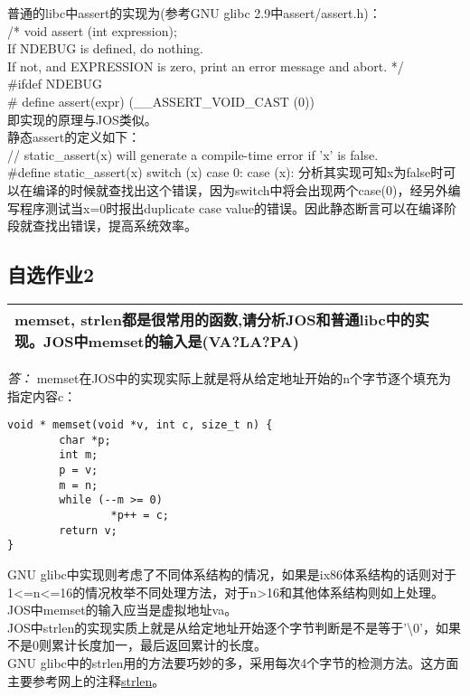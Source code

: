 \documentclass[11pt,a4paper]{article}
\begin{document}
普通的libc中assert的实现为(参考GNU glibc 2.9中assert/assert.h)：\\
/* void assert (int expression);\\
   If NDEBUG is defined, do nothing.\\
   If not, and EXPRESSION is zero, print an error message and abort.  */\\
\#ifdef  NDEBUG\\
\# define assert(expr)           (\_\_ASSERT\_VOID\_CAST (0))\\
即实现的原理与JOS类似。\\

静态assert的定义如下：\\
// static\_assert(x) will generate a compile-time error if 'x' is false.
\\ \#define static\_assert(x)        switch (x) case 0: case (x):
分析其实现可知x为false时可以在编译的时候就查找出这个错误，因为switch中将会出现两个case(0)，经另外编写程序测试当x=0时报出duplicate case value的错误。因此静态断言可以在编译阶段就查找出错误，提高系统效率。\\

\subsection{自选作业2}
\begin{tabular}{|p{\textwidth}|}
\hline
memset, strlen都是很常用的函数,请分析JOS和普通libc中的实现。JOS中memset的输入是(VA?LA?PA)\\
\hline
\end{tabular}
\textit{\large{答：}}
memset在JOS中的实现实际上就是将从给定地址开始的n个字节逐个填充为指定内容c：\\
\begin{verbatim}void * memset(void *v, int c, size_t n) { 
        char *p; 
        int m;
        p = v;
        m = n;
        while (--m >= 0)
                *p++ = c;
        return v;
}\end{verbatim}
GNU glibc中实现则考虑了不同体系结构的情况，如果是ix86体系结构的话则对于1<=n<=16的情况枚举不同处理方法，对于n>16和其他体系结构则如上处理。\\
JOS中memset的输入应当是虚拟地址va。\\

JOS中strlen的实现实质上就是从给定地址开始逐个字节判断是不是等于'\textbackslash{}0'，如果不是0则累计长度加一，最后返回累计的长度。\\
\indent GNU glibc中的strlen用的方法要巧妙的多，采用每次4个字节的检测方法。这方面主要参考网上的注释\href{http://bigwhite.blogbus.com/logs/37753065.html}{strlen}。
\end{document}
